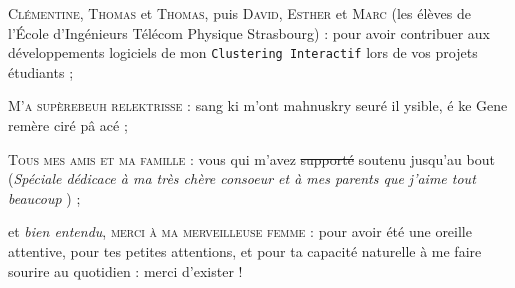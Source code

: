 \begin{ThesisAcknowledgments}
\begin{todolist}
		\item[\itemok] \textsc{Clémentine}, \textsc{Thomas} et \textsc{Thomas}, puis \textsc{David}, \textsc{Esther} et \textsc{Marc} (les élèves de l'École d'Ingénieurs Télécom Physique Strasbourg) : pour avoir contribuer aux développements logiciels de mon \texttt{Clustering Interactif} lors de vos projets étudiants ;
		\item[\itemok] \textsc{M'a supèrebeuh relektrisse} : sang ki m'ont mahnuskry seuré il ysible, é ke Gene remère ciré pâ acé ;
		\item[\itemok] \textsc{Tous mes amis et ma famille} : vous qui m'avez \st{supporté} soutenu jusqu'au bout (\textit{Spéciale dédicace à ma très chère consoeur et à mes parents que j'aime tout beaucoup \faGrinWink}) ;
		\item[\itemok] et \textit{bien entendu}, \textsc{merci à ma merveilleuse femme} : pour avoir été une oreille attentive, pour tes petites attentions, et pour ta capacité naturelle à me faire sourire au quotidien : merci d'exister ! \textcolor{colorDarkPastelRed}{\faHeart}
	\end{todolist}

\end{ThesisAcknowledgments}